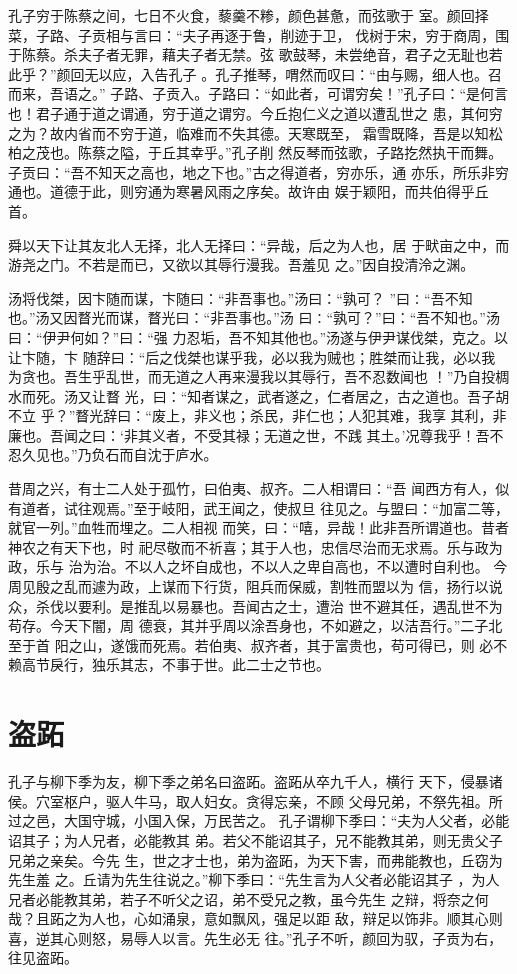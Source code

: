 \documentclass[12pt,UTF8]{ctexbook}
\begin{document}
孔子穷于陈蔡之间，七日不火食，藜羹不糁，颜色甚惫，而弦歌于 室。颜回择菜，子路、子贡相与言曰：“夫子再逐于鲁，削迹于卫， 伐树于宋，穷于商周，围于陈蔡。杀夫子者无罪，藉夫子者无禁。弦 歌鼓琴，未尝绝音，君子之无耻也若此乎？”颜回无以应，入告孔子 。孔子推琴，喟然而叹曰：“由与赐，细人也。召而来，吾语之。” 子路、子贡入。子路曰：“如此者，可谓穷矣！”孔子曰：“是何言 也！君子通于道之谓通，穷于道之谓穷。今丘抱仁义之道以遭乱世之 患，其何穷之为？故内省而不穷于道，临难而不失其德。天寒既至， 霜雪既降，吾是以知松柏之茂也。陈蔡之隘，于丘其幸乎。”孔子削 然反琴而弦歌，子路扢然执干而舞。 子贡曰：“吾不知天之高也，地之下也。”古之得道者，穷亦乐，通 亦乐，所乐非穷通也。道德于此，则穷通为寒暑风雨之序矣。故许由 娱于颖阳，而共伯得乎丘首。

舜以天下让其友北人无择，北人无择曰：“异哉，后之为人也，居 于畎亩之中，而游尧之门。不若是而已，又欲以其辱行漫我。吾羞见 之。”因自投清泠之渊。

汤将伐桀，因卞随而谋，卞随曰：“非吾事也。”汤曰：“孰可？ ”曰∶“吾不知也。”汤又因瞀光而谋，瞀光曰：“非吾事也。”汤 曰∶“孰可？”曰：“吾不知也。”汤曰：“伊尹何如？”曰：“强 力忍垢，吾不知其他也。”汤遂与伊尹谋伐桀，克之。以让卞随，卞 随辞曰：“后之伐桀也谋乎我，必以我为贼也；胜桀而让我，必以我 为贪也。吾生乎乱世，而无道之人再来漫我以其辱行，吾不忍数闻也 ！”乃自投椆水而死。汤又让瞀 光，曰：“知者谋之，武者遂之，仁者居之，古之道也。吾子胡不立 乎？”瞀光辞曰：“废上，非义也；杀民，非仁也；人犯其难，我享 其利，非廉也。吾闻之曰：‘非其义者，不受其禄；无道之世，不践 其土。’况尊我乎！吾不忍久见也。”乃负石而自沈于庐水。

昔周之兴，有士二人处于孤竹，曰伯夷、叔齐。二人相谓曰：“吾 闻西方有人，似有道者，试往观焉。”至于岐阳，武王闻之，使叔旦 往见之。与盟曰：“加富二等，就官一列。”血牲而埋之。二人相视 而笑，曰：“嘻，异哉！此非吾所谓道也。昔者神农之有天下也，时 祀尽敬而不祈喜；其于人也，忠信尽治而无求焉。乐与政为政，乐与 治为治。不以人之坏自成也，不以人之卑自高也，不以遭时自利也。 今周见殷之乱而遽为政，上谋而下行货，阻兵而保威，割牲而盟以为 信，扬行以说众，杀伐以要利。是推乱以易暴也。吾闻古之士，遭治 世不避其任，遇乱世不为苟存。今天下闇，周 德衰，其并乎周以涂吾身也，不如避之，以洁吾行。”二子北至于首 阳之山，遂饿而死焉。若伯夷、叔齐者，其于富贵也，苟可得已，则 必不赖高节戾行，独乐其志，不事于世。此二士之节也。
\section{盗跖}

孔子与柳下季为友，柳下季之弟名曰盗跖。盗跖从卒九千人，横行 天下，侵暴诸侯。穴室枢户，驱人牛马，取人妇女。贪得忘亲，不顾 父母兄弟，不祭先祖。所过之邑，大国守城，小国入保，万民苦之。 孔子谓柳下季曰：“夫为人父者，必能诏其子；为人兄者，必能教其 弟。若父不能诏其子，兄不能教其弟，则无贵父子兄弟之亲矣。今先 生，世之才士也，弟为盗跖，为天下害，而弗能教也，丘窃为先生羞 之。丘请为先生往说之。”柳下季曰：“先生言为人父者必能诏其子 ，为人兄者必能教其弟，若子不听父之诏，弟不受兄之教，虽今先生 之辩，将奈之何哉？且跖之为人也，心如涌泉，意如飘风，强足以距 敌，辩足以饰非。顺其心则喜，逆其心则怒，易辱人以言。先生必无 往。”孔子不听，颜回为驭，子贡为右，往见盗跖。
\end{document}

